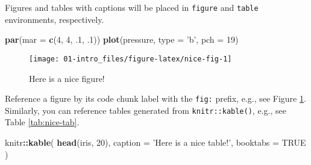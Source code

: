 \documentclass[]{book}
\newenvironment{Shaded}{\begin{snugshade}}{\end{snugshade}}
\newcommand{\KeywordTok}[1]{\textcolor[rgb]{0.13,0.29,0.53}{\textbf{#1}}}
\newcommand{\DataTypeTok}[1]{\textcolor[rgb]{0.13,0.29,0.53}{#1}}
\newcommand{\DecValTok}[1]{\textcolor[rgb]{0.00,0.00,0.81}{#1}}
\newcommand{\StringTok}[1]{\textcolor[rgb]{0.31,0.60,0.02}{#1}}
\newcommand{\OtherTok}[1]{\textcolor[rgb]{0.56,0.35,0.01}{#1}}
\newcommand{\OperatorTok}[1]{\textcolor[rgb]{0.81,0.36,0.00}{\textbf{#1}}}
\newcommand{\NormalTok}[1]{#1}
\begin{document}
Figures and tables with captions will be placed in \texttt{figure} and
\texttt{table} environments, respectively.

\begin{Shaded}
\begin{Highlighting}[]
\KeywordTok{par}\NormalTok{(}\DataTypeTok{mar =} \KeywordTok{c}\NormalTok{(}\DecValTok{4}\NormalTok{, }\DecValTok{4}\NormalTok{, .}\DecValTok{1}\NormalTok{, .}\DecValTok{1}\NormalTok{))}
\KeywordTok{plot}\NormalTok{(pressure, }\DataTypeTok{type =} \StringTok{'b'}\NormalTok{, }\DataTypeTok{pch =} \DecValTok{19}\NormalTok{)}
\end{Highlighting}
\end{Shaded}

\begin{figure}

{\centering \texttt{[image: 01-intro\_files/figure-latex/nice-fig-1]} 

}

\caption{Here is a nice figure!}\label{fig:nice-fig}
\end{figure}

Reference a figure by its code chunk label with the \texttt{fig:}
prefix, e.g., see Figure \ref{fig:nice-fig}. Similarly, you can
reference tables generated from \texttt{knitr::kable()}, e.g., see Table
\ref{tab:nice-tab}.

\begin{Shaded}
\begin{Highlighting}[]
\NormalTok{knitr}\OperatorTok{::}\KeywordTok{kable}\NormalTok{(}
  \KeywordTok{head}\NormalTok{(iris, }\DecValTok{20}\NormalTok{), }\DataTypeTok{caption =} \StringTok{'Here is a nice table!'}\NormalTok{,}
  \DataTypeTok{booktabs =} \OtherTok{TRUE}
\NormalTok{)}
\end{Highlighting}
\end{Shaded}
\end{document}
